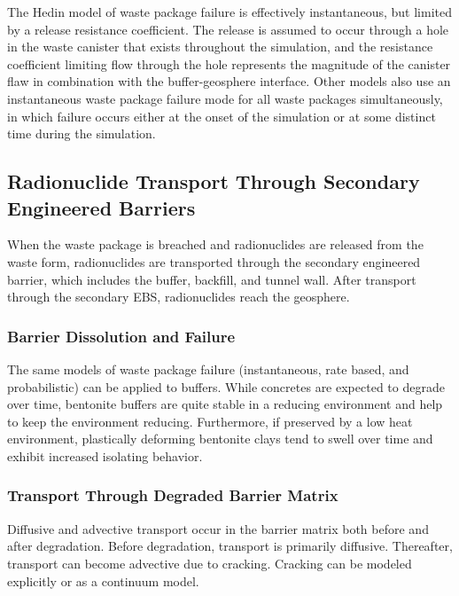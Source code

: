 The Hedin model of waste package failure is effectively instantaneous, but
limited by a release resistance coefficient. The release is assumed  to occur
through a hole in the waste canister that exists throughout the simulation, and
the resistance coefficient limiting flow through the hole represents the
magnitude of the canister flaw in combination with the buffer-geosphere
interface\cite{hedin_integrated_2002}.  Other models also use an instantaneous 
waste package failure mode for all waste  packages simultaneously, in which 
failure occurs either at the onset of the simulation or at some distinct time 
during the simulation. 




\subsection{Radionuclide Transport Through Secondary Engineered Barriers}

When the waste package is breached and radionuclides are released from the waste 
form, radionuclides are transported through the secondary engineered barrier, 
which includes the buffer, backfill, and tunnel wall. After transport through 
the secondary \gls{EBS}, radionuclides reach the geosphere. 

\subsubsection{Barrier Dissolution and Failure}

The same models of waste package failure (instantaneous, rate based, and 
probabilistic) can be applied to buffers. While concretes are expected to 
degrade over time, bentonite buffers are quite stable in a reducing 
environment and help to keep the environment reducing. Furthermore, if 
preserved by a low heat environment, plastically deforming bentonite
clays tend to swell over time and exhibit increased isolating behavior.

\subsubsection{Transport Through Degraded Barrier Matrix}

Diffusive and advective transport occur in the barrier matrix both before and 
after degradation. Before degradation, transport is primarily diffusive. 
Thereafter, transport can become advective due to cracking. Cracking can be 
modeled explicitly or as a continuum model.  

